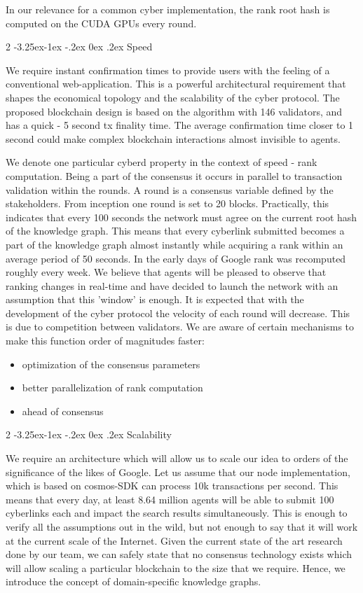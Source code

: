 \documentclass[8pt,oneside]{amsart}
\makeatletter
\newcommand{\linkred}[2]{\href{#1}{\color{red}{#2}}}
\newcommand{\linkgreen}[2]{\href{#1}{\color{green}{#2}}}
\renewcommand\subsection{\@startsection{subsection}
                                    {2}{\z@}
                                    {-3.25ex\@plus -1ex \@minus -.2ex}
                                    {0ex \@plus .2ex}
                                    {\play\Large}
                        }
\newcommand{\titleSection}[1]{\subsection{#1}}
\newcommand{\code}[1]{{\PlayBold #1}}
\makeatother
\begin{document}
In our relevance for a common \code{cyber} implementation, the rank root hash is computed on the CUDA GPUs every round.

\titleSection{Speed}\label{speed}

We require instant confirmation times to provide users with the feeling of a conventional web-application. This is a powerful architectural requirement that shapes the economical topology and the scalability of the cyber protocol. The proposed blockchain design is based on the \linkgreen{https://ipfs.io/ipfs/QmaMtD7xDgghqgjN62zWZ5TBGFiEjGQtuZBjJ9sMh816KJ}{Tendermint consensus} algorithm with 146 validators, and has a quick - 5 second tx finality time. The average confirmation time closer to 1 second could make complex blockchain interactions almost invisible to agents.

We denote one particular cyberd property in the context of speed - rank computation. Being a part of the consensus it occurs in parallel to transaction validation within the rounds. A round is a consensus variable defined by the stakeholders. From inception one round is set to 20 blocks. Practically, this indicates that every 100 seconds the network must agree on the current root hash of the knowledge graph. This means that every cyberlink submitted becomes a part of the knowledge graph almost instantly while acquiring a rank within an average period of 50 seconds. In the early days of Google rank was recomputed roughly every week. We believe that agents will be pleased to observe that ranking changes in real-time and have decided to launch the network with an assumption that this 'window' is enough. It is expected that with the development of the cyber protocol the velocity of each round will decrease. This is due to competition between validators. We are aware of certain mechanisms to make this function order of magnitudes faster:

\begin{itemize}
\item optimization of the consensus parameters
\item better parallelization of rank computation
\item \linkred{https://medium.com/solana-labs/proof-of-history-a-clock-for-blockchain-cf47a61a9274}{a better clock} ahead of consensus
\end{itemize}

\titleSection{Scalability}\label{scalability}

We require an architecture which will allow us to scale our idea to orders of the significance of the likes of Google. Let us assume that our node implementation, which is based on \code{cosmos-SDK} can process 10k transactions per second. This means that every day, at least 8.64 million agents will be able to submit 100 cyberlinks each and impact the search results simultaneously. This is enough to verify all the assumptions out in the wild, but not enough to say that it will work at the current scale of the Internet. Given the current state of the art research done by our team, we can safely state that no consensus technology exists which will allow scaling a particular blockchain to the size that we require. Hence, we introduce the concept of domain-specific knowledge graphs.
\end{document}

